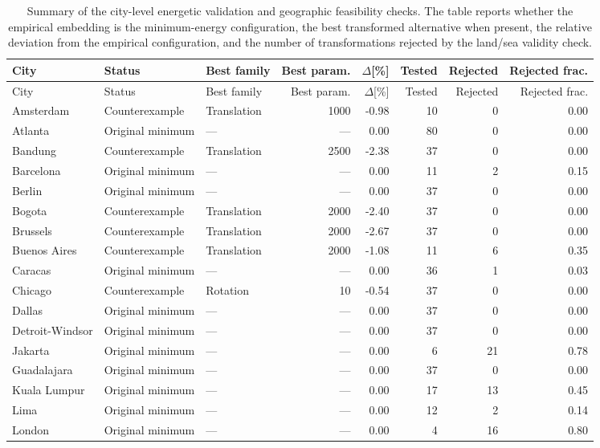 \documentclass{article}
\begin{document}
\begin{longtable}{lllrrrrr}
\caption{\label{tab:supp:summary}Summary of the city-level energetic validation and geographic feasibility checks. The table reports whether the empirical embedding is the minimum-energy configuration, the best transformed alternative when present, the relative deviation from the empirical configuration, and the number of transformations rejected by the land/sea validity check.}\\
\toprule
City & Status & Best family & Best param. & $\Delta$[\%] & Tested & Rejected & Rejected frac. \\
\midrule
\endfirsthead
\toprule
City & Status & Best family & Best param. & $\Delta$[\%] & Tested & Rejected & Rejected frac. \\
\midrule
\endhead
Amsterdam & Counterexample & Translation & 1000 & -0.98 & 10 & 0 & 0.00 \\
Atlanta & Original minimum & --- & --- & 0.00 & 80 & 0 & 0.00 \\
Bandung & Counterexample & Translation & 2500 & -2.38 & 37 & 0 & 0.00 \\
Barcelona & Original minimum & --- & --- & 0.00 & 11 & 2 & 0.15 \\
Berlin & Original minimum & --- & --- & 0.00 & 37 & 0 & 0.00 \\
Bogota & Counterexample & Translation & 2000 & -2.40 & 37 & 0 & 0.00 \\
Brussels & Counterexample & Translation & 2000 & -2.67 & 37 & 0 & 0.00 \\
Buenos Aires & Counterexample & Translation & 2000 & -1.08 & 11 & 6 & 0.35 \\
Caracas & Original minimum & --- & --- & 0.00 & 36 & 1 & 0.03 \\
Chicago & Counterexample & Rotation & 10 & -0.54 & 37 & 0 & 0.00 \\
Dallas & Original minimum & --- & --- & 0.00 & 37 & 0 & 0.00 \\
Detroit-Windsor & Original minimum & --- & --- & 0.00 & 37 & 0 & 0.00 \\
Jakarta & Original minimum & --- & --- & 0.00 & 6 & 21 & 0.78 \\
Guadalajara & Original minimum & --- & --- & 0.00 & 37 & 0 & 0.00 \\
Kuala Lumpur & Original minimum & --- & --- & 0.00 & 17 & 13 & 0.45 \\
Lima & Original minimum & --- & --- & 0.00 & 12 & 2 & 0.14 \\
London & Original minimum & --- & --- & 0.00 & 4 & 16 & 0.80 \\

\end{longtable}
\end{document}
